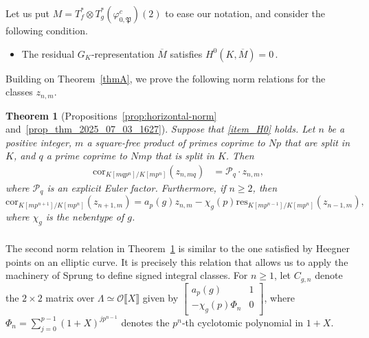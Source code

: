 \documentclass{amsart}
\makeatletter
\numberwithin{equation}{section}
\newcommand{\mylabel}[2]{#2\def\@currentlabel{#2}\label{#1}}
\newtheorem{lthm}{Theorem}
\newcommand{\frk}{\mathfrak}
\newcommand{\cO}{\mathcal{O}}
\newcommand{\cP}{\mathcal{P}}
\makeatother
\begin{document}
\subsubsection{} Let us put $M=T_f^\ast\otimes T_g^\ast(\varphi_{0,\frk{P}}^c)(2)$ to ease our notation, and consider the following condition. 
\begin{itemize}
    \item[(\mylabel{item_H0}{\textbf{H}$^0$})] The residual $G_{K}$-representation $ \overline{M}$ satisfies $H^0(K,\overline{M})=0$\,.
\end{itemize}
Building on Theorem~\ref{thmA}, we prove the following norm relations for the classes $z_{n,m}$.
\begin{lthm}[Propositions~\ref{prop:horizontal-norm} and~\ref{prop_thm_2025_07_03_1627}]\label{thmB}
Suppose that \eqref{item_H0}  holds. Let $n$ be a positive integer, $m$ a square-free product of primes coprime to $Np$ that are split in $K$, and $q$ a prime coprime to $Nmp$ that is split in $K$. Then
    \begin{align*}
        \mathrm{cor}_{K[mqp^n]/K[mp^n]}(z_{n,mq}) &= \cP_q\cdot z_{n,m},
    \end{align*}
    where $\cP_q$ is an explicit Euler factor.
Furthermore, if $n\geq 2$, then
    \[
    \mathrm{cor}_{K[mp^{n+1}]/K[mp^n]}(z_{n+1,m})=a_p(g)z_{n,m}-\chi_g(p)\mathrm{res}_{K[mp^{n-1}]/K[mp^n]}(z_{n-1,m}),
    \]
    where $\chi_g$ is the nebentype of $g$.
\end{lthm}

\subsubsection{} The second norm relation in Theorem~\ref{thmB} is similar to the one satisfied by Heegner points on an elliptic curve. It is precisely this relation that allows us to apply the machinery of Sprung to define signed integral classes.  For $n\ge1$, let $C_{g,n}$ denote the $2\times2$ matrix over $\Lambda\simeq\cO\llbracket X\rrbracket$ given by
$\begin{bmatrix}
    a_p(g)&1\\ -\chi_g(p)\Phi_n&0
    \end{bmatrix}$, where $\Phi_n=\sum_{j=0}^{p-1}(1+X)^{jp^{n-1}}$ denotes the $p^n$-th cyclotomic polynomial in $1+X$. 
\end{document}

